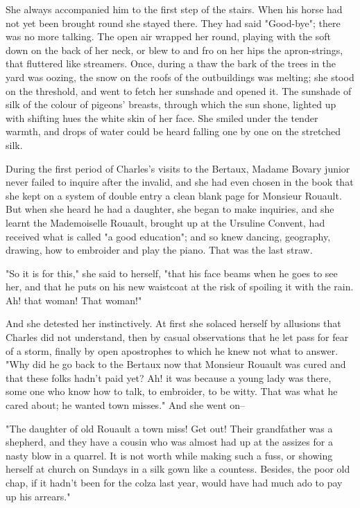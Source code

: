 \documentclass[11pt,twocolumn]{ltugboat}
\begin{document}
She always accompanied him to the first step of the stairs. When his
horse had not yet been brought round she stayed there. They had said
"Good-bye"; there was no more talking. The open air wrapped her round,
playing with the soft down on the back of her neck, or blew to and fro
on her hips the apron-strings, that fluttered like streamers. Once,
during a thaw the bark of the trees in the yard was oozing, the snow on
the roofs of the outbuildings was melting; she stood on the threshold,
and went to fetch her sunshade and opened it. The sunshade of silk of
the colour of pigeons' breasts, through which the sun shone, lighted
up with shifting hues the white skin of her face. She smiled under the
tender warmth, and drops of water could be heard falling one by one on
the stretched silk.

During the first period of Charles's visits to the Bertaux, Madame
Bovary junior never failed to inquire after the invalid, and she had
even chosen in the book that she kept on a system of double entry a
clean blank page for Monsieur Rouault. But when she heard he had a
daughter, she began to make inquiries, and she learnt the Mademoiselle
Rouault, brought up at the Ursuline Convent, had received what is called
"a good education"; and so knew dancing, geography, drawing, how to
embroider and play the piano. That was the last straw.

"So it is for this," she said to herself, "that his face beams when he
goes to see her, and that he puts on his new waistcoat at the risk of
spoiling it with the rain. Ah! that woman! That woman!"

And she detested her instinctively. At first she solaced herself by
allusions that Charles did not understand, then by casual observations
that he let pass for fear of a storm, finally by open apostrophes to
which he knew not what to answer. "Why did he go back to the Bertaux now
that Monsieur Rouault was cured and that these folks hadn't paid yet?
Ah! it was because a young lady was there, some one who know how to
talk, to embroider, to be witty. That was what he cared about; he wanted
town misses." And she went on--

"The daughter of old Rouault a town miss! Get out! Their grandfather was
a shepherd, and they have a cousin who was almost had up at the assizes
for a nasty blow in a quarrel. It is not worth while making such a fuss,
or showing herself at church on Sundays in a silk gown like a countess.
Besides, the poor old chap, if it hadn't been for the colza last year,
would have had much ado to pay up his arrears."
\end{document}
